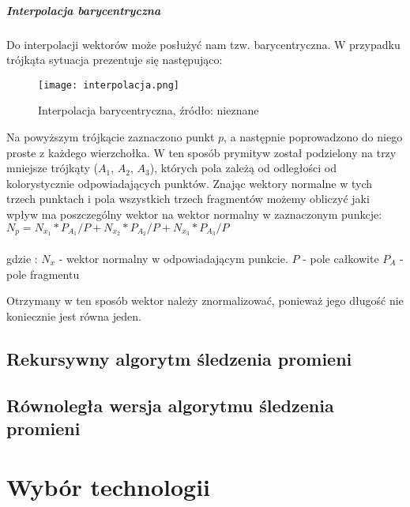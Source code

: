 \subparagraph{Interpolacja barycentryczna}

Do interpolacji wektorów może posłużyć nam tzw. barycentryczna. W przypadku trójkąta sytuacja prezentuje się następująco:

\begin{figure}[h!]
\centering
  \caption{Interpolacja barycentryczna, źródło: nieznane}
  \texttt{[image: interpolacja.png]}
\end{figure}

Na powyższym trójkącie zaznaczono punkt $p$, a następnie poprowadzono do niego proste z każdego wierzchołka. W ten sposób prymityw został podzielony na trzy mniejsze trójkąty ($A_1$, $A_2$, $A_3$), których pola zależą od odległości od kolorystycznie odpowiadających punktów. Znając wektory normalne w tych trzech punktach i pola wszystkich trzech fragmentów możemy obliczyć jaki wpływ ma poszczególny wektor na wektor normalny w zaznaczonym punkcje:
\\
$N_p = N_{x_1} * P_{A_1}/P + N_{x_2} * P_{A_2}/P + N_{x_3} * P_{A_3}/P$\\
\\
gdzie :
$N_x$ - wektor normalny w odpowiadającym punkcie.
$P$ - pole całkowite
$P_A$ - pole fragmentu

Otrzymany w ten sposób wektor należy znormalizować, ponieważ jego długość nie koniecznie jest równa jeden.

  




\subsection{Rekursywny algorytm śledzenia promieni}
\subsection{Równoległa wersja algorytmu śledzenia promieni}

\section{Wybór technologii}